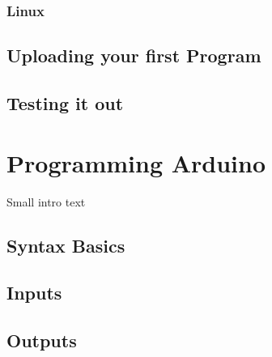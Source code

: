 \documentclass[11pt,a4paper]{article}
\begin{document}

\subsubsection{Linux} %
\label{ssub:linux}



\subsection{Uploading your first Program} %
\label{sub:uploading_your_first_program}


\subsection{Testing it out} %
\label{sub:testing_it_out}



\section{Programming Arduino} %
\label{sec:programming_arduino}

Small intro text

\subsection{Syntax Basics} %
\label{sub:syntax_basics}


\subsection{Inputs} %
\label{sub:inputs}


\subsection{Outputs} %
\label{sub:available_hardware}




\end{document}
